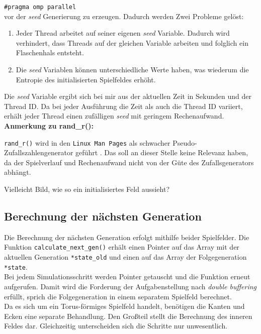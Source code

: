 \documentclass[german,plainarticle,hyperref,utf8,appendix]{zihpub}
\begin{document}
   	\texttt{\#pragma omp parallel}\\
   	
   	vor der \textit{seed} Generierung zu erzeugen. Dadurch werden Zwei Probleme gelöst:
   	\begin{enumerate}
   	\item Jeder Thread arbeitet auf seiner eigenen \textit{seed} Variable. Dadurch wird verhindert, dass Threads auf der gleichen Variable arbeiten und folglich ein Flaschenhals entsteht.
   	\item Die \textit{seed} Variablen können unterschiedliche Werte haben, was wiederum die Entropie des initialisierten Spielfeldes erhöht.
   	\end{enumerate}
   	
   	Die \textit{seed} Variable ergibt sich bei mir aus der aktuellen Zeit in Sekunden und der Thread ID. Da bei jeder Ausführung die Zeit als auch die Thread ID variiert, erhält jeder Thread einen zufälligen \textit{seed} mit geringem Rechenaufwand.\\
   	
   	\textbf{Anmerkung zu rand\_r():}
   	
   	\texttt{rand\_r()} wird in den \texttt{Linux Man Pages} als schwacher Pseudo-Zufallszahlengenerator geführt \cite{lmp}. Das soll an dieser Stelle keine Relevanz haben, da der Spielverlauf und Rechenaufwand nicht von der Güte des Zufallsgenerators abhängt.
   	
   	Vielleicht Bild, wie so ein initialisiertes Feld aussieht?
   	
   	\subsection{Berechnung der nächsten Generation}
   	Die Berechnung der nächsten Generation erfolgt mithilfe beider Spielfelder. Die Funktion \texttt{calculate\_next\_gen()} erhält einen Pointer auf das Array mit der aktuellen Generation \texttt{*state\_old} und einen auf das Array der Folgegeneration \texttt{*state}.\\
   	Bei jedem Simulationsschritt werden Pointer getauscht und die Funktion erneut aufgerufen. Damit wird die Forderung der Aufgabenstellung nach \textit{double buffering} erfüllt, sprich die Folgegeneration in einem separatem Spielfeld berechnet.\\
   	Da es sich um ein Torus-förmiges Spielfeld handelt, benötigen die Kanten und Ecken eine separate Behandlung. Den Großteil stellt die Berechnung des inneren Feldes dar. Gleichzeitig unterscheiden sich die Schritte nur unwesentlich.\\
   	
\end{document}
